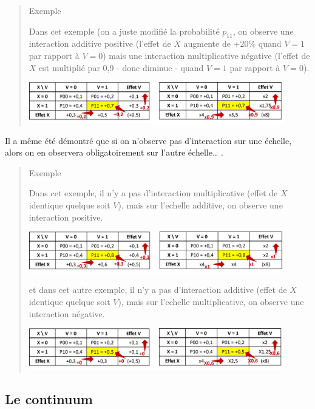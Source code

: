 \documentclass[
]{book}
\begin{document}
\begin{quote}
Exemple

Dans cet exemple (on a juste modifié la probabilité \(p_{11}\), on observe une interaction additive positive (l'effet de \(X\) augmente de +20\% quand \(V=1\) par rapport à \(V=0\)) mais une interaction multiplicative négative (l'effet de \(X\) est multiplié par 0,9 - donc diminue - quand \(V=1\) par rapport à \(V=0\)).

\includegraphics[width=0.9\textwidth,height=\textheight]{img/Image4.png}
\end{quote}

Il a même été démontré que si on n'observe pas d'interaction sur une échelle, alors on en observera obligatoirement sur l'autre échelle\ldots{} \citet{vanderweele_tutorial_2014}.

\begin{quote}
Exemple

Dans cet exemple, il n'y a pas d'interaction multiplicative (effet de \(X\) identique quelque soit \(V\)), mais sur l'echelle additive, on observe une interaction positive.

\includegraphics[width=0.9\textwidth,height=\textheight]{img/Image5.png}

et dans cet autre exemple, il n'y a pas d'interaction additive (effet de \(X\) identique quelque soit \(V\)), mais sur l'echelle multiplicative, on observe une interaction négative.

\includegraphics[width=0.9\textwidth,height=\textheight]{img/Image5b.png}
\end{quote}

\hypertarget{le-continuum}{%
\subsection*{Le continuum}\label{le-continuum}}
\end{document}
